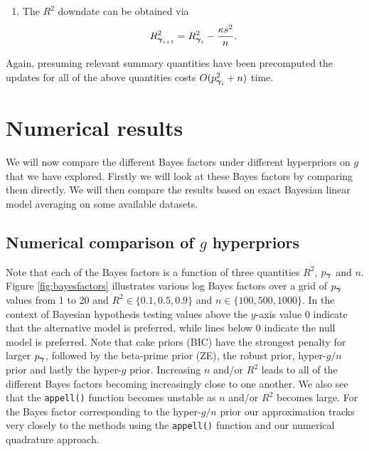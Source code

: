 {\begin{enumerate}
	\noindent where $[ \widehat{\vbeta}_{\vgamma_{i}}]_{-|{\vgamma_{i}}|}$
	removes the last column from $\widehat{\vbeta}_{\vgamma_{i}}$.
	
	\item 
	The $R^2$ downdate can be obtained
	via
	$$
	R_{{\boldsymbol \gamma}_{i+1}}^2 = R_{{\boldsymbol \gamma}_{i}}^2 - \frac{\kappa s^2}{n}.
	$$
	
	
\end{enumerate}

\noindent Again, presuming relevant summary quantities have been precomputed
the updates for all of the above quantities costs $O(p_{{\boldsymbol \gamma}_{i}}^2 + n)$
time.

\section{Numerical results}
\label{sec:numerical_g_prior}

We will now compare the different Bayes factors under different hyperpriors on
$g$ that we have explored.  Firstly we will look at these Bayes factors by
comparing them directly.  We will then compare the results based on exact
Bayesian linear model averaging on some available datasets.

\subsection{Numerical comparison of $g$ hyperpriors}

Note that each of the Bayes factors is a function of three quantities $R^2$,
$p_{\boldsymbol \gamma}$ and $n$. Figure \ref{fig:bayesfactors} illustrates various log
Bayes factors over a grid of $p_{\boldsymbol \gamma}$ values from 1 to 20 and
$R^2\in\{0.1,0.5,0.9\}$ and $n \in \{100,500,1000\}$. In the context of
Bayesian hypothesis testing values above the $y$-axis value 0 indicate that the
alternative model is preferred, while lines below 0 indicate the null model is
preferred. Note that cake priors (BIC) have the strongest penalty for larger
$p_{\boldsymbol \gamma}$, followed by the beta-prime prior (ZE), the robust prior,
hyper-$g/n$ prior and lastly the hyper-$g$ prior. Increasing $n$ and/or $R^2$
leads to all of the different Bayes factors becoming increasingly close to one
another. We also see that the {\tt appell()} function becomes unstable as $n$
and/or $R^2$ becomes large.  For the Bayes factor corresponding to the
hyper-$g/n$ prior our approximation tracks very closely to the methods using
the {\tt appell()} function and our numerical quadrature approach.

}
